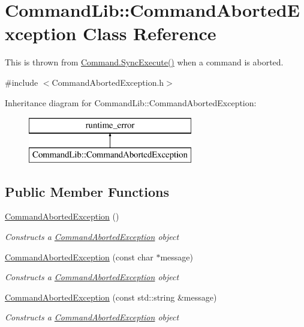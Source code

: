 \hypertarget{class_command_lib_1_1_command_aborted_exception}{}\section{Command\+Lib\+:\+:Command\+Aborted\+Exception Class Reference}
\label{class_command_lib_1_1_command_aborted_exception}


This is thrown from \mbox{\hyperlink{class_command_lib_1_1_command_a5d33760ccb927d7f6349c02907ab4ff3}{Command.\+Sync\+Execute()}} when a command is aborted.  




{\ttfamily \#include $<$Command\+Aborted\+Exception.\+h$>$}

Inheritance diagram for Command\+Lib\+:\+:Command\+Aborted\+Exception\+:\begin{figure}[H]
\begin{center}
\leavevmode
\includegraphics[height=2.000000cm]{class_command_lib_1_1_command_aborted_exception}
\end{center}
\end{figure}
\subsection*{Public Member Functions}
\begin{DoxyCompactItemize}
\item 
\mbox{\hyperlink{class_command_lib_1_1_command_aborted_exception_af5a16bb24375fcba3b2f5c0523d50902}{Command\+Aborted\+Exception}} ()
\begin{DoxyCompactList}\small\item\em Constructs a \mbox{\hyperlink{class_command_lib_1_1_command_aborted_exception}{Command\+Aborted\+Exception}} object \end{DoxyCompactList}\item 
\mbox{\hyperlink{class_command_lib_1_1_command_aborted_exception_ab599bf3faa5161b7c82aa490b0dd6ce3}{Command\+Aborted\+Exception}} (const char $\ast$message)
\begin{DoxyCompactList}\small\item\em Constructs a \mbox{\hyperlink{class_command_lib_1_1_command_aborted_exception}{Command\+Aborted\+Exception}} object \end{DoxyCompactList}\item 
\mbox{\hyperlink{class_command_lib_1_1_command_aborted_exception_a26303ba9a320b9734678fb46575326c4}{Command\+Aborted\+Exception}} (const std\+::string \&message)
\begin{DoxyCompactList}\small\item\em Constructs a \mbox{\hyperlink{class_command_lib_1_1_command_aborted_exception}{Command\+Aborted\+Exception}} object \end{DoxyCompactList}\end{DoxyCompactItemize}


